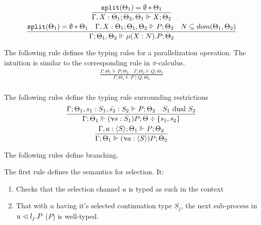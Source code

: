 \begin{gather*}
\frac{\texttt{split}(\Theta_1) = \emptyset * \Theta_1}{\Gamma , X : \Theta_1 ; \Theta_2, \Theta_1 \Vdash X ; \Theta_2}\\
\frac{\texttt{split}(\Theta_1) = \emptyset * \Theta_1 \quad \Gamma , X : \Theta_1 ; \Theta_1, \Theta_2 \Vdash P ; \Theta_2 \quad N \subseteq dom(\Theta_1, \Theta_2)}{\Gamma ; \Theta_1, \Theta_2 \Vdash \mu(X : N) . P ; \Theta_2}
\end{gather*}

The following rule defines the typing rules for a parallelization operation. The intuition is similar to the corresponding rule in $\pi$-calculus.
\begin{gather*}
\frac{\Gamma ; \Theta_1 \Vdash P ; \Theta_2 \quad \Gamma ; \Theta_2 \Vdash Q ; \Theta_3}{\Gamma ; \Theta_1 \Vdash P \mid Q ; \Theta_3} \\
\end{gather*}

The following rules define the typing rule surrounding restrictions 
\begin{gather*}
\frac{\Gamma ; \Theta_1 , s_1 : S_1, \bar{s_2} : S_2 \Vdash P ; \Theta_2 \quad S_1 \text{ dual } S_2}{\Gamma ; \Theta_1 \Vdash (\upnu s : S_1)P ; \Theta \div \{s_1, s_2\}} \\
\frac{\Gamma, a : \langle S \rangle ; \Theta_1 \Vdash P ; \Theta_2}{\Gamma ; \Theta_1 \Vdash (\upnu a : \langle S \rangle)P ; \Theta_2} \\
\end{gather*}


The following rules define branching.

The first rule defines the semantics for selection. It:
\begin{enumerate}
    \item Checks that the selection channel $u$ is typed as such in the context
    \item That with $u$ having it's selected continuation type $S_j$, the next sub-process in $u \vartriangleleft l_j . P$ ($P$) is well-typed.
\end{enumerate}

